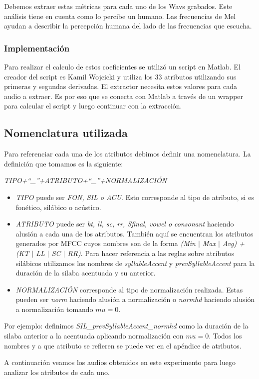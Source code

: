 Debemos extraer estas métricas para cada uno de los Wavs grabados. Este análisis tiene en cuenta como lo percibe un humano. Las frecuencias de Mel ayudan a describir la percepción humana del lado de las frecuencias que escucha. 

\subsubsection{Implementación}

Para realizar el calculo de estos coeficientes se utilizó un script en Matlab. El creador del script es Kamil Wojcicki y utiliza los 33 atributos utilizando sus primeras y segundas derivadas. El extractor necesita estos valores para cada audio a extraer. Es por eso que se conecta con Matlab a través de un wrapper para calcular el script y luego continuar con la extracción.

\subsection{Nomenclatura utilizada}
Para referenciar cada una de los atributos debimos definir una nomenclatura. La definición que tomamos es la siguiente:
\begin{center}
\textit{TIPO+``\_''+ATRIBUTO+``\_''+NORMALIZACIÓN} 
\end{center}

\begin{itemize}
  \item \emph{TIPO} puede ser \emph{FON, SIL o ACU}. Esto corresponde al tipo de atributo, si es fonético, silábico o acústico.
  \item \emph{ATRIBUTO} puede ser \emph{kt, ll, sc, rr, Sfinal, vowel o consonant} haciendo alusión a cada una de los atributos. También aquí se encuentran los atributos generados por MFCC cuyos nombres son de la forma \emph{(Min $|$ Max $|$ Avg) + (KT $|$ LL $|$ SC $|$ RR)}. Para hacer referencia a las reglas sobre atributos silábicos utilizamos los nombres de \emph{syllableAccent} y \emph{prevSyllableAccent} para la duración de la silaba acentuada y su anterior.
  \item \emph{NORMALIZACIÓN} corresponde al tipo de normalización realizada. Estas pueden ser \emph{norm} haciendo alusión a normalización o \emph{normhd} haciendo alusión a normalización tomando $mu=0$.
\end{itemize}
 
Por ejemplo: definimos \textit{SIL\_prevSyllableAccent\_normhd} como la duración de la silaba anterior a la acentuada aplicando normalización con $mu=0$. Todos los nombres y a que atributo se refieren se puede ver en el apéndice de atributos.

A continuación veamos los audios obtenidos en este experimento para luego analizar los atributos de cada uno.